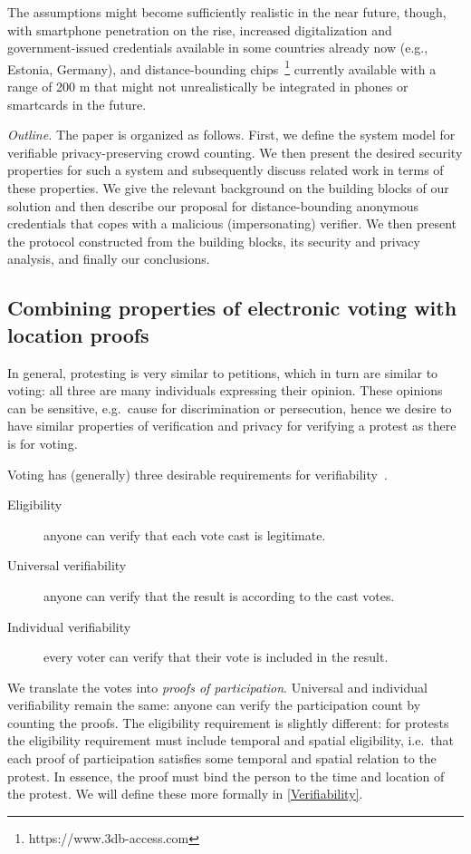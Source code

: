 The assumptions might
become sufficiently realistic in the near future, though, with
smartphone penetration on the rise, increased digitalization and government-issued credentials
available in some countries already now (e.g., Estonia, Germany), and
distance-bounding chips~\footnote{ https://www.3db-access.com } currently available with a range of 200 m that
might not unrealistically be integrated in phones or smartcards in the
future. 

\emph{Outline.} The paper is organized as follows. 
First, we define the system model for verifiable privacy-preserving crowd counting.  We then
present the desired security properties for such a system and subsequently discuss related
work in terms of these properties. We give the relevant background on
the building blocks of our solution and then describe our proposal for
distance-bounding anonymous credentials that copes with a malicious
(impersonating) verifier. We then present the protocol constructed
from the building blocks, its security and privacy analysis, and
finally our conclusions. 

\subsection{Combining properties of electronic voting with location proofs}

In general, protesting is very similar to petitions, which in turn are similar 
to voting: all three are many individuals expressing their opinion.
These opinions can be sensitive, e.g.\ cause for discrimination or persecution, 
hence we desire to have similar properties of verification and privacy for 
verifying a protest as there is for voting.

Voting has (generally) three desirable requirements for 
verifiability~\cite{VerifyingPrivacyPropertiesOfVotingProtocols}.
\begin{description}
  \item[Eligibility] anyone can verify that each vote cast is legitimate.
  \item[Universal verifiability] anyone can verify that the result is according 
    to the cast votes.
  \item[Individual verifiability] every voter can verify that their vote is 
    included in the result.
\end{description}
We translate the votes into \emph{proofs of participation}.
Universal and individual verifiability remain the same: anyone can verify the 
participation count by counting the proofs.
The eligibility requirement is slightly different:
for protests the eligibility requirement must include temporal and spatial 
eligibility, i.e.\ that each proof of participation satisfies some temporal and 
spatial relation to the protest.
In essence, the proof must bind the person to the time and location of the 
protest.
We will define these more formally in \cref{Verifiability}.

